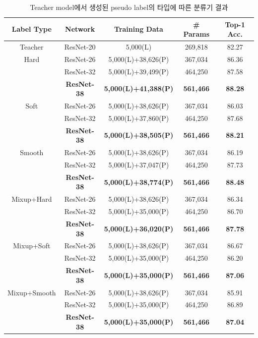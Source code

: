 \begin{table}[!h]
  \center
  \begin{tabular}{|c|c|c|c|c|}
\hline
Label Type & Network & Training Data & \# Params & Top-1 Acc. \\ \hline
Teacher & ResNet-20 & 5,000(L) & 269,818 & 82.27 \\ \hline
Hard & ResNet-26 & 5,000(L)+38,626(P) & 367,034 & 86.36 \\
     & ResNet-32 & 5,000(L)+39,499(P) & 464,250 & 87.58 \\
     & \textbf{ResNet-38} & \textbf{5,000(L)+41,388(P)}
& \textbf{561,466} & \textbf{88.28} \\ \hline

Soft & ResNet-26 & 5,000(L)+38,626(P) & 367,034 & 86.03 \\
     & ResNet-32 & 5,000(L)+37,860(P) & 464,250 & 87.68 \\
     & \textbf{ResNet-38} & \textbf{5,000(L)+38,505(P)}
& \textbf{561,466} & \textbf{88.21} \\ \hline

Smooth & ResNet-26 & 5,000(L)+38,626(P) & 367,034 & 86.19 \\
       & ResNet-32 & 5,000(L)+37,047(P) & 464,250 & 87.73 \\
       & \textbf{ResNet-38} & \textbf{5,000(L)+38,774(P)}
& \textbf{561,466} & \textbf{88.48} \\ \hline

Mixup+Hard & ResNet-26 & 5,000(L)+38,626(P) & 367,034 & 86.34 \\
           & ResNet-32 & 5,000(L)+35,000(P) & 464,250 & 86.70 \\
           & \textbf{ResNet-38} & \textbf{5,000(L)+36,020(P)}
& \textbf{561,466} & \textbf{87.78} \\ \hline

Mixup+Soft & ResNet-26 & 5,000(L)+38,626(P) & 367,034 & 86.67 \\
           & ResNet-32 & 5,000(L)+35,000(P) & 464,250 & 86.20 \\
           & \textbf{ResNet-38} & \textbf{5,000(L)+35,000(P)}
& \textbf{561,466} & \textbf{87.06} \\ \hline

Mixup+Smooth & ResNet-26 & 5,000(L)+38,626(P) & 367,034 & 85.91 \\
             & ResNet-32 & 5,000(L)+35,000(P) & 464,250 & 86.89 \\
             & \textbf{ResNet-38} & \textbf{5,000(L)+35,000(P)}
& \textbf{561,466} & \textbf{87.04} \\ \hline
  \end{tabular}
  \caption{Teacher model에서 생성된 pseudo label의 타입에 따른 분류기 결과}
  \label{labeltype}
\end{table}

